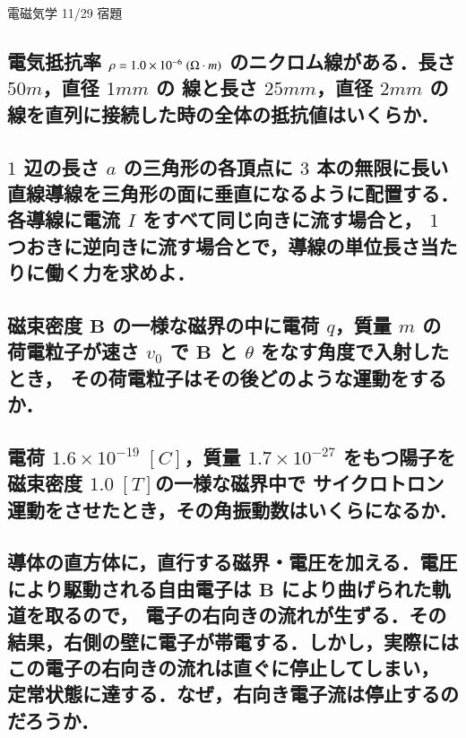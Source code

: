 \documentclass[a4paper, 12pt]{bxjsarticle}
\begin{document}
\begin{center}
    \begin{huge}
        電磁気学 11/29 宿題
    \end{huge}
\end{center}

\subsection{電気抵抗率 \(\rho = 1.0\times10^{-6}\;\si(\Omega \cdot m)\) のニクロム線がある．長さ \(50\si{m}\)，直径 \(1\si{mm}\) の%
線と長さ \(25\si{mm}\)，直径 \(2\si{mm}\) の線を直列に接続した時の全体の抵抗値はいくらか．}
\vspace{20em}

\subsection{\(1\) 辺の長さ \(a\) の三角形の各頂点に \(3\) 本の無限に長い直線導線を三角形の面に垂直になるように配置する．各導線に電流 \(I\) をすべて同じ向きに流す場合と，%
\(1\) つおきに逆向きに流す場合とで，導線の単位長さ当たりに働く力を求めよ．}

\newpage
\subsection{磁束密度 \(\boldsymbol{B}\) の一様な磁界の中に電荷 \(q\)，質量 \(m\) の荷電粒子が速さ \(v_0\) で \(\boldsymbol{B}\) と \(\theta\) をなす角度で入射したとき，%
その荷電粒子はその後どのような運動をするか．}
\vspace{20em}

\subsection{電荷 \(1.6\times10^{-19}\;\si{[C]}\)，質量 \(1.7\times10^{-27}\) をもつ陽子を磁束密度 \(1.0\;\si{[T]}\)の一様な磁界中で%
サイクロトロン運動をさせたとき，その角振動数はいくらになるか．}
\newpage

\subsection{導体の直方体に，直行する磁界・電圧を加える．電圧により駆動される自由電子は \(\boldsymbol{B}\) により曲げられた軌道を取るので，%
電子の右向きの流れが生ずる．その結果，右側の壁に電子が帯電する．しかし，実際にはこの電子の右向きの流れは直ぐに停止してしまい，%
定常状態に達する．なぜ，右向き電子流は停止するのだろうか．}
\end{document}
